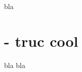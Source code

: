 \documentclass[12pt,a4paper]{nsiexo}
\begin{document}
\maketitle
bla
\section{- truc cool}
bla bla
\end{document}
